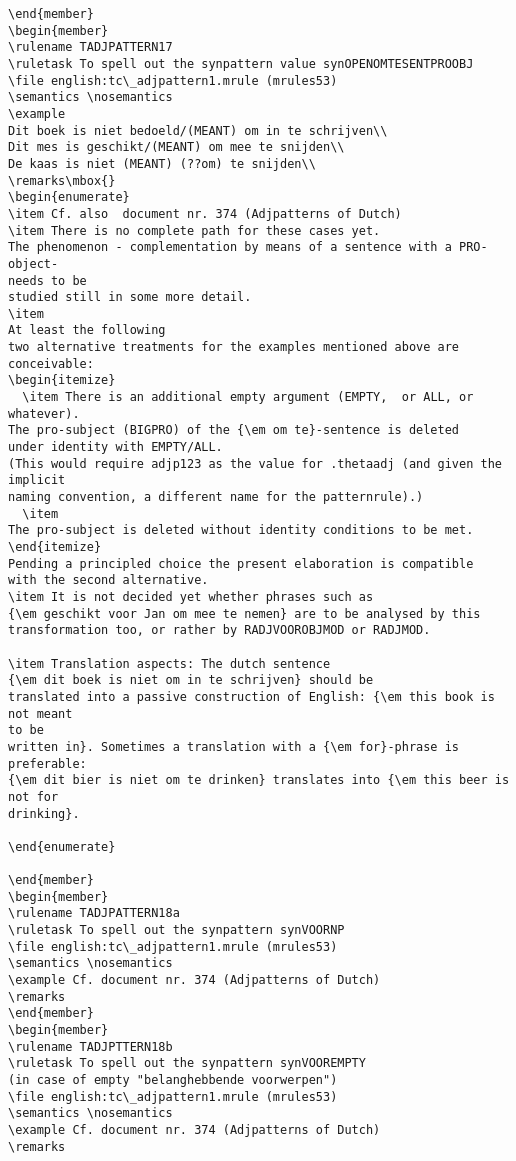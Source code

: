 \begin{verbatim}
\end{member}
\begin{member}
\rulename TADJPATTERN17
\ruletask To spell out the synpattern value synOPENOMTESENTPROOBJ
\file english:tc\_adjpattern1.mrule (mrules53)
\semantics \nosemantics
\example 
Dit boek is niet bedoeld/(MEANT) om in te schrijven\\
Dit mes is geschikt/(MEANT) om mee te snijden\\
De kaas is niet (MEANT) (??om) te snijden\\
\remarks\mbox{}
\begin{enumerate}
\item Cf. also  document nr. 374 (Adjpatterns of Dutch)
\item There is no complete path for these cases yet. 
The phenomenon - complementation by means of a sentence with a PRO-object- 
needs to be 
studied still in some more detail. 
\item 
At least the following 
two alternative treatments for the examples mentioned above are 
conceivable:
\begin{itemize}
  \item There is an additional empty argument (EMPTY,  or ALL, or whatever).
The pro-subject (BIGPRO) of the {\em om te}-sentence is deleted 
under identity with EMPTY/ALL. 
(This would require adjp123 as the value for .thetaadj (and given the implicit 
naming convention, a different name for the patternrule).) 
  \item
The pro-subject is deleted without identity conditions to be met.
\end{itemize}
Pending a principled choice the present elaboration is compatible 
with the second alternative.
\item It is not decided yet whether phrases such as 
{\em geschikt voor Jan om mee te nemen} are to be analysed by this 
transformation too, or rather by RADJVOOROBJMOD or RADJMOD.

\item Translation aspects: The dutch sentence 
{\em dit boek is niet om in te schrijven} should be 
translated into a passive construction of English: {\em this book is not meant 
to be
written in}. Sometimes a translation with a {\em for}-phrase is preferable:
{\em dit bier is niet om te drinken} translates into {\em this beer is not for 
drinking}. 

\end{enumerate}

\end{member}
\begin{member}
\rulename TADJPATTERN18a
\ruletask To spell out the synpattern synVOORNP
\file english:tc\_adjpattern1.mrule (mrules53)
\semantics \nosemantics
\example Cf. document nr. 374 (Adjpatterns of Dutch)
\remarks
\end{member}
\begin{member}
\rulename TADJPTTERN18b
\ruletask To spell out the synpattern synVOOREMPTY 
(in case of empty "belanghebbende voorwerpen")
\file english:tc\_adjpattern1.mrule (mrules53)
\semantics \nosemantics
\example Cf. document nr. 374 (Adjpatterns of Dutch)
\remarks


\end{verbatim}
